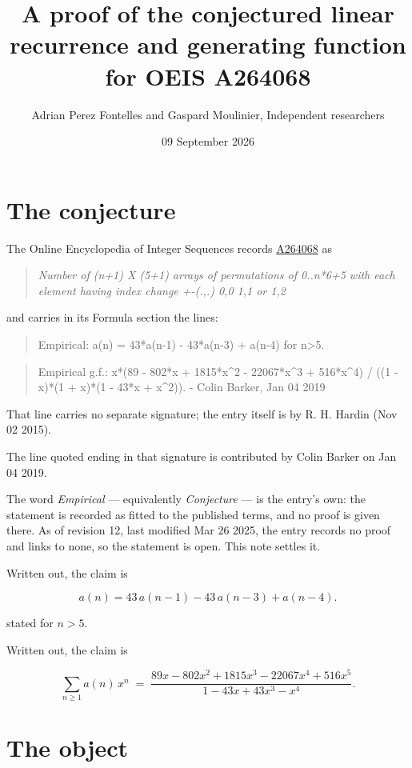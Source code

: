 \documentclass[11pt]{article}
\title{A proof of the conjectured linear recurrence and generating function for OEIS A264068}
\author{Adrian Perez Fontelles and Gaspard Moulinier, Independent researchers}
\date{09 September 2026}
\theoremstyle{definition}
\begin{document}
\maketitle
\section{The conjecture}

The Online Encyclopedia of Integer Sequences records \href{https://oeis.org/A264068}{A264068} as

\begin{quote}\itshape Number of (n+1) X (5+1) arrays of permutations of 0..n*6+5 with each element having index change +-(.,.) 0,0 1,1 or 1,2\end{quote}

and carries in its Formula section the lines:

\begin{quote}\ttfamily Empirical: a(n) = 43*a(n-1) - 43*a(n-3) + a(n-4) for n>5.\end{quote}

\begin{quote}\ttfamily Empirical g.f.: x*(89 - 802*x + 1815*x\textasciicircum{}2 - 22067*x\textasciicircum{}3 + 516*x\textasciicircum{}4) / ((1 - x)*(1 + x)*(1 - 43*x + x\textasciicircum{}2)). - Colin Barker, Jan 04 2019\end{quote}

That line carries no separate signature; the entry itself is by R. H. Hardin (Nov 02 2015).

The line quoted ending in that signature is contributed by Colin Barker on Jan 04 2019.

The word {\itshape Empirical} --- equivalently {\itshape Conjecture} --- is the entry's own: the statement is recorded as fitted to the published terms, and no proof is given there. As of revision 12, last modified Mar 26 2025, the entry records no proof and links to none, so the statement is open. This note settles it.

Written out, the claim is

\[a(n) = 43\,a(n-1) - 43\,a(n-3) + a(n-4).\]

stated for $n > 5$.

Written out, the claim is

\[\sum_{n \ge 1} a(n)\,x^n \;=\; \frac{89x - 802x^{2} + 1815x^{3} - 22067x^{4} + 516x^{5}}{1 - 43x + 43x^{3} - x^{4}}.\]

\section{The object}
\end{document}
